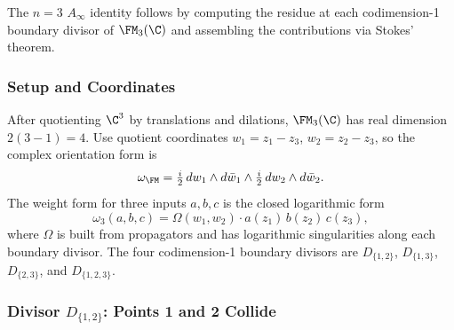 The $n=3$ $A_\infty$ identity follows by computing the residue at each codimension-1 boundary divisor of $\FM_3(\C)$ and assembling the contributions via Stokes' theorem.

\subsubsection{Setup and Coordinates}

After quotienting $\C^3$ by translations and dilations, $\FM_3(\C)$ has real dimension $2(3-1) = 4$. Use quotient coordinates $w_1 = z_1 - z_3$, $w_2 = z_2 - z_3$, so the complex orientation form is
\[
\omega_{\FM} = \tfrac{i}{2}\, dw_1 \wedge d\bar{w}_1 \wedge \tfrac{i}{2}\, dw_2 \wedge d\bar{w}_2.
\]
The weight form for three inputs $a, b, c$ is the closed logarithmic form
\[
\omega_3(a,b,c) = \Omega(w_1, w_2) \cdot a(z_1)\, b(z_2)\, c(z_3),
\]
where $\Omega$ is built from propagators and has logarithmic singularities along each boundary divisor. The four codimension-1 boundary divisors are $D_{\{1,2\}}$, $D_{\{1,3\}}$, $D_{\{2,3\}}$, and $D_{\{1,2,3\}}$.

\subsubsection{Divisor $D_{\{1,2\}}$: Points 1 and 2 Collide}

